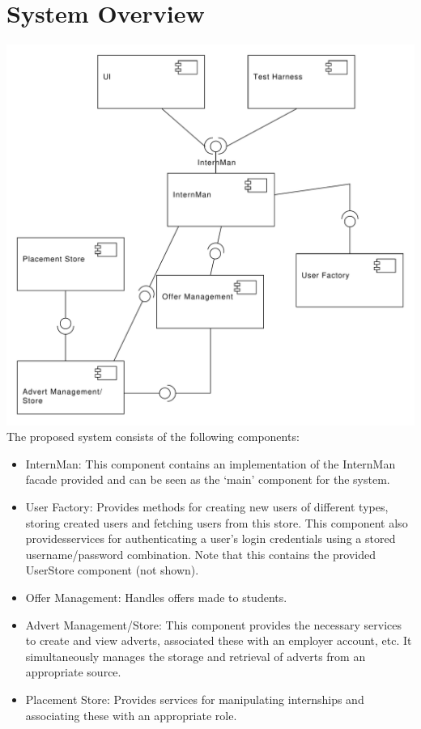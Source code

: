 \documentclass{l3deliverable}
\begin{document}
\section{System Overview}
\includegraphics[scale = 0.4]{ComponentDiagram.pdf}\\
The proposed system consists of the following components:
\begin{itemize}
\item{InternMan: This component contains an implementation of the InternMan facade provided and can be seen as the `main' component for the system. }
\item{User Factory: Provides methods for creating new users of different types, storing created users and fetching users from this store. This component also providesservices for authenticating a user's login credentials using a stored username/password combination. Note that this contains the provided UserStore component (not shown).}
\item{Offer Management: Handles offers made to students.}
\item{Advert Management/Store: This component provides the necessary services to create and view adverts, associated these with an employer account, etc. It simultaneously
manages the storage and retrieval of adverts from an appropriate source.}
\item{Placement Store: Provides services for manipulating internships and associating these with an appropriate role.}
\end{itemize}
\end{document}
